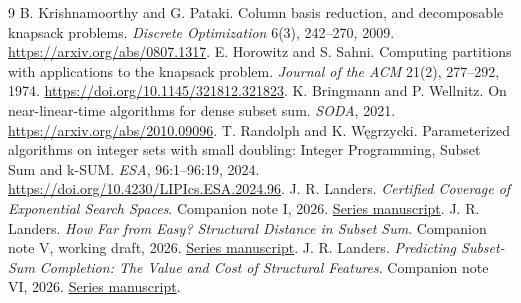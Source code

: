 \documentclass[10pt,english]{article}
\begin{document}
\begingroup\small
\begin{thebibliography}{9}
\setlength{\itemsep}{2pt}\setlength{\parskip}{2pt}
 B. Krishnamoorthy and G. Pataki. Column basis reduction, and decomposable knapsack problems. \emph{Discrete Optimization} 6(3), 242--270, 2009. \url{https://arxiv.org/abs/0807.1317}.
 E. Horowitz and S. Sahni. Computing partitions with applications to the knapsack problem. \emph{Journal of the ACM} 21(2), 277--292, 1974. \url{https://doi.org/10.1145/321812.321823}.
 K. Bringmann and P. Wellnitz. On near-linear-time algorithms for dense subset sum. \emph{SODA}, 2021. \url{https://arxiv.org/abs/2010.09096}.
 T. Randolph and K. W\k{e}grzycki. Parameterized algorithms on integer sets with small doubling: Integer Programming, Subset Sum and k-SUM. \emph{ESA}, 96:1--96:19, 2024. \url{https://doi.org/10.4230/LIPIcs.ESA.2024.96}.
 J. R. Landers. \emph{Certified Coverage of Exponential Search Spaces}. Companion note I, 2026. \href{../01-certified-coverage/Certified_Coverage_of_Exponential_Search_Spaces.pdf}{Series manuscript}.
 J. R. Landers. \emph{How Far from Easy? Structural Distance in Subset Sum}. Companion note V, working draft, 2026. \href{../05-structural-distance/Structural_Distance_in_Subset_Sum.pdf}{Series manuscript}.
 J. R. Landers. \emph{Predicting Subset-Sum Completion: The Value and Cost of Structural Features}. Companion note VI, 2026. \href{../06-learned-solvability/Predicting_Subset_Sum_Completion.pdf}{Series manuscript}.
\end{thebibliography}
\endgroup
\end{document}
